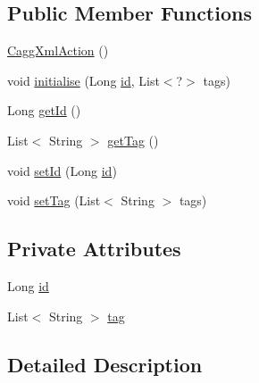 \subsection*{Public Member Functions}
\begin{DoxyCompactItemize}
\item 
\hyperlink{classit_1_1emarolab_1_1cagg_1_1debugging_1_1result2XML_1_1CaggXmlAction_a59ad1cf97342659ce9e78bc2aef402c8}{Cagg\-Xml\-Action} ()
\item 
void \hyperlink{classit_1_1emarolab_1_1cagg_1_1debugging_1_1result2XML_1_1CaggXmlAction_a4a57689a470f6e4f94e0e625ca9b1036}{initialise} (Long \hyperlink{classit_1_1emarolab_1_1cagg_1_1debugging_1_1result2XML_1_1CaggXmlAction_a2b15660ca15668e40dccd89970b3ac9c}{id}, List$<$?$>$ tags)
\item 
Long \hyperlink{classit_1_1emarolab_1_1cagg_1_1debugging_1_1result2XML_1_1CaggXmlAction_ad977781904edf8f8d492fcb2a03b02d9}{get\-Id} ()
\item 
List$<$ String $>$ \hyperlink{classit_1_1emarolab_1_1cagg_1_1debugging_1_1result2XML_1_1CaggXmlAction_a27ee53e0f8f0a25c895b502fd27cec41}{get\-Tag} ()
\item 
void \hyperlink{classit_1_1emarolab_1_1cagg_1_1debugging_1_1result2XML_1_1CaggXmlAction_adb8d888eac7e0d7406435f368e71a60e}{set\-Id} (Long \hyperlink{classit_1_1emarolab_1_1cagg_1_1debugging_1_1result2XML_1_1CaggXmlAction_a2b15660ca15668e40dccd89970b3ac9c}{id})
\item 
void \hyperlink{classit_1_1emarolab_1_1cagg_1_1debugging_1_1result2XML_1_1CaggXmlAction_a6c2f93cb94795b4850dbc242c1a99db1}{set\-Tag} (List$<$ String $>$ tags)
\end{DoxyCompactItemize}
\subsection*{Private Attributes}
\begin{DoxyCompactItemize}
\item 
Long \hyperlink{classit_1_1emarolab_1_1cagg_1_1debugging_1_1result2XML_1_1CaggXmlAction_a2b15660ca15668e40dccd89970b3ac9c}{id}
\item 
List$<$ String $>$ \hyperlink{classit_1_1emarolab_1_1cagg_1_1debugging_1_1result2XML_1_1CaggXmlAction_abd992cf43827fe2afb0ef8f7effef91e}{tag}
\end{DoxyCompactItemize}


\subsection{Detailed Description}


